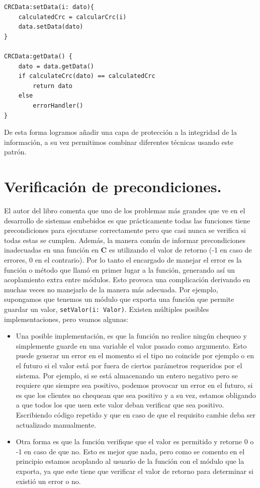 \begin{lstlisting}
CRCData:setData(i: dato){
    calculatedCrc = calcularCrc(i)
    data.setData(dato)
}

CRCData:getData() {
    dato = data.getData()
    if calculateCrc(dato) == calculatedCrc
        return dato
    else
        errorHandler()
}
\end{lstlisting}

De esta forma logramos añadir una capa de protección a la integridad de la información, a su vez permitimos combinar diferentes técnicas usando este patrón.

\section{Verificación de precondiciones.}
El autor del libro comenta que uno de los problemas más grandes que ve en el desarrollo de sistemas embebidos es que prácticamente todas las funciones tiene precondiciones para ejecutarse correctamente pero que casi nunca se verifica si todas estas se cumplen. Además, la manera común de informar precondiciones inadecuadas en una función en \textbf{C} es utilizando el valor de retorno (-1 en caso de errores, 0 en el contrario). Por lo tanto el encargado de manejar el error es la función o método que llamó en primer lugar a la función, generando así un acoplamiento extra entre módulos. Esto provoca una complicación derivando en muchas veces no manejarlo de la manera más adecuada. Por ejemplo, supongamos que tenemos un módulo que exporta una función que permite guardar un valor, \verb|setValor(i: Valor)|. Existen múltiples posibles implementaciones, pero veamos algunas:
\begin{itemize}
    \item Una posible implementación, es que la función no realice ningún chequeo y simplemente guarde en una variable el valor pasado como argumento. Esto puede generar un error en el momento si el tipo no coincide por ejemplo o en el futuro si el valor está por fuera de ciertos parámetros requeridos por el sistema. Por ejemplo, si se está almacenando un entero negativo pero se requiere que siempre sea positivo, podemos provocar un error en el futuro, si es que los clientes no chequean que sea positivo y a su vez, estamos obligando a que todos los que usen este valor deban verificar que sea positivo. Escribiendo código repetido y que en caso de que el requisito cambie deba ser actualizado manualmente.
    \item Otra forma es que la función verifique que el valor es permitido y retorne 0 o -1 en caso de que no. Esto es mejor que nada, pero como se comento en el principio estamos acoplando al usuario de la función con el módulo que la exporta, ya que este tiene que verificar el valor de retorno para determinar si existió un error o no.
\end{itemize}

